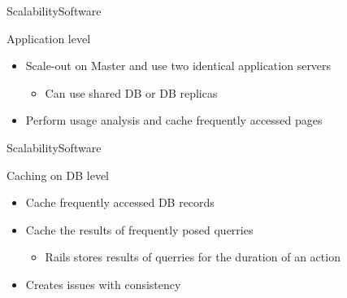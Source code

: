 \begin{frame}{Scalability}{Software}
\begin{block}{Application level}
  \begin{itemize}
    \item Scale-out on Master and use two identical application servers
    \begin{itemize}
			\item Can use shared DB or DB replicas
		\end{itemize}
    \item Perform usage analysis and cache frequently accessed pages
  \end{itemize}
\end{block}
\end{frame}

\begin{frame}{Scalability}{Software}
\begin{block}{Caching on DB level}
  \begin{itemize}
    \item Cache frequently accessed DB records
    \item Cache the results of frequently posed querries
    	\begin{itemize}
				\item Rails stores results of querries for the duration of an action
			\end{itemize}
		\item Creates issues with consistency
  \end{itemize}
\end{block}
\end{frame}